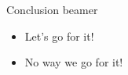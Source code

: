 \documentclass[
  ignorenonframetext,
  aspectratio=169,
  aspectratio=169]{beamer}
\providecommand{\tightlist}{%
  \setlength{\itemsep}{0pt}\setlength{\parskip}{0pt}}
\providecommand{\tightlist}{%
  \setlength{\itemsep}{0pt}\setlength{\parskip}{0pt}}
\begin{document}
\begin{frame}{Conclusion beamer}
\label{conclusion-beamer}
\begin{itemize}
\tightlist
\item
  Let's go for it!
\item
  No way we go for it!
\end{itemize}
\end{frame}
\end{document}
